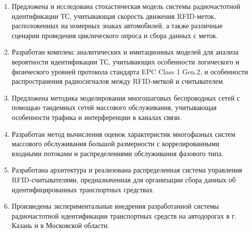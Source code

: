 \begin{enumerate}
  \item Предложена и исследована стохастическая модель системы радиочастотной идентификации ТС, учитывающая скорость движения RFID-меток, расположенных на номерных знаках автомобилей, а также различные сценарии проведения циклического опроса и сбора данных с меток.
  \item Разработан комплекс аналитических и имитационных моделей для анализа вероятности идентификации ТС, учитывающих особенности логического и физического уровней протокола стандарта EPC Class 1 Gen.2, и особенности распространения радиосигналов между RFID-меткой и считывателем.
  \item Предложена методика моделирования многошаговых беспроводных сетей с помощью тандемных сетей массового обслуживания, учитывающая особенности трафика и интерференции в каналах связи.
  \item Разработан метод вычисления оценок характеристик многофазных систем массового обслуживания большой размерности с коррелированными входными потоками и распределениями обслуживания фазового типа.
  \item Разработана архитектура и реализована распределенная система управления RFID-считывателями, предназначенная для организации сбора данных об идентифицированных транспортных средствах.
  \item Произведены экспериментальные внедрения разработанной системы радиочастотной идентификации транспортных средств на автодорогах в г. Казань и в Московской области.


\end{enumerate}
